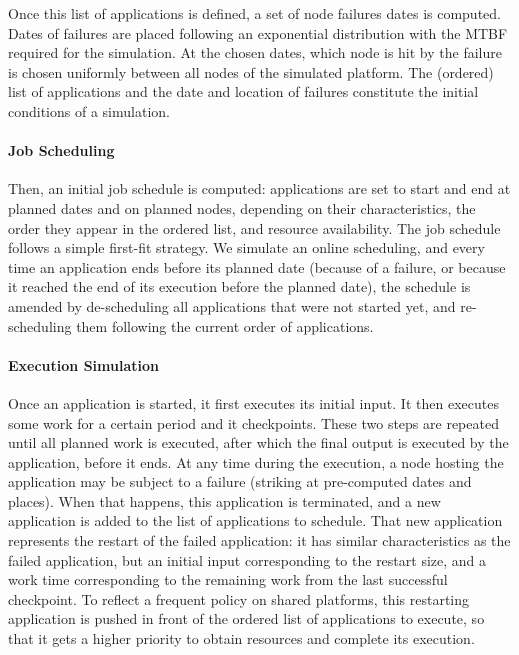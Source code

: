 Once this list of applications is defined, a set of node failures
dates is computed. Dates of failures are placed following an
exponential distribution with the MTBF required for the simulation. At
the chosen dates, which node is hit by the failure is chosen uniformly
between all nodes of the simulated platform. The (ordered) list of
applications and the date and location of failures constitute the
initial conditions of a simulation.

\paragraph*{Job Scheduling}
Then, an initial job schedule is computed: applications are set to
start and end at planned dates and on planned nodes, depending on
their characteristics, the order they appear in
the ordered list, and resource availability. The job schedule follows a
simple first-fit
strategy. We simulate an online scheduling, and every time an
application ends before its planned date (because of a failure, or
because it reached the end of its execution before the planned date),
the schedule is amended by de-scheduling all applications that were
not started yet, and re-scheduling them following the current order of
applications.

\paragraph*{Execution Simulation}
Once an application is started, it first executes its initial
input. It then executes some work for a certain period and it
checkpoints. These two steps are repeated until all planned work is
executed, after which the final output is executed by the application,
before it ends. At any time during the execution, a node hosting the
application may be subject to a failure (striking at pre-computed
dates and places). When that happens, this application is terminated,
and a new application is added to the list of applications to
schedule. That new application represents the restart of the failed
application: it has similar characteristics as the failed application,
but an initial input corresponding to the restart size, and a work
time corresponding to the remaining work from the last
successful checkpoint. To reflect a frequent policy on shared
platforms, this restarting application is pushed in front of the
ordered list of applications to execute, so that it gets a higher
priority to obtain resources and complete its execution.

